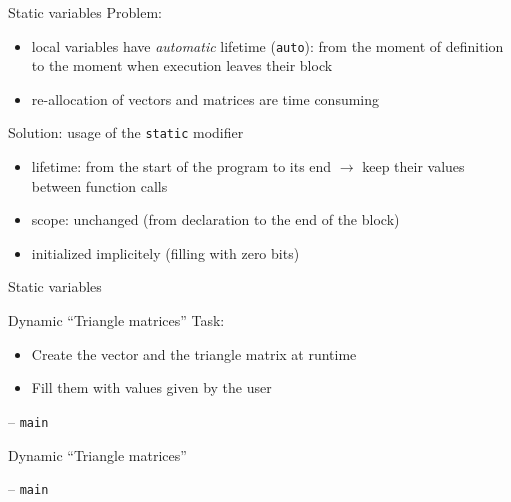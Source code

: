 \documentclass[usenames,dvipsnames,aspectratio=169]{beamer}
\begin{document}
\begin{frame}{Static variables}
  Problem:
  \begin{itemize}
    \item local variables have \emph{automatic} lifetime (\texttt{auto}): from the moment of definition to the moment when execution leaves their block
    \item re-allocation of vectors and matrices are time consuming
  \end{itemize}
  \vfill
  Solution: usage of the \texttt{static} modifier
  \begin{itemize}
    \item lifetime: from the start of the program to its end $\to$ keep their values between function calls
    \item scope: unchanged (from declaration to the end of the block)
    \item initialized implicitely (filling with zero bits)
  \end{itemize}
\end{frame}

\begin{frame}{Static variables}
  \begin{exampleblock}{}
    \scriptsize
    
  \end{exampleblock}
\end{frame}

\begin{frame}{Dynamic ``Triangle matrices''}
  Task: 
  \begin{itemize}
    \item Create the vector and the triangle matrix at runtime
    \item Fill them with values given by the user
  \end{itemize}
  \begin{exampleblock}{ -- \texttt{main}}
    \scriptsize
    
  \end{exampleblock}
\end{frame}

\begin{frame}{Dynamic ``Triangle matrices''}
  \begin{exampleblock}{ -- \texttt{main}}
    \footnotesize
    
  \end{exampleblock}
\end{frame}
\end{document}
